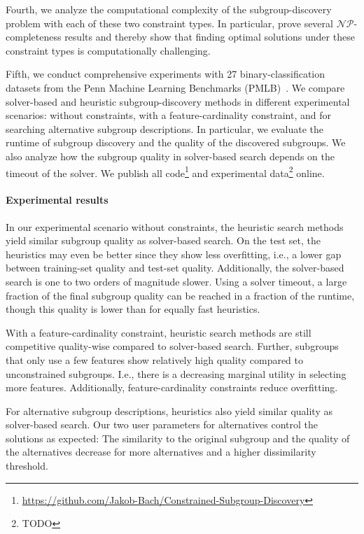 \documentclass{article}
\theoremstyle{definition}
\begin{document}
Fourth, we analyze the computational complexity of the subgroup-discovery problem with each of these two constraint types.
In particular, prove several $\mathcal{NP}$-completeness results and thereby show that finding optimal solutions under these constraint types is computationally challenging.

Fifth, we conduct comprehensive experiments with 27 binary-classification datasets from the Penn Machine Learning Benchmarks (PMLB)~\cite{olson2017pmlb, romano2021pmlb}.
We compare solver-based and heuristic subgroup-discovery methods in different experimental scenarios:
without constraints, with a feature-cardinality constraint, and for searching alternative subgroup descriptions.
In particular, we evaluate the runtime of subgroup discovery and the quality of the discovered subgroups.
We also analyze how the subgroup quality in solver-based search depends on the timeout of the solver.
We publish all code\footnote{\url{https://github.com/Jakob-Bach/Constrained-Subgroup-Discovery}} and experimental data\footnote{TODO} online.

\paragraph{Experimental results}

In our experimental scenario without constraints, the heuristic search methods yield similar subgroup quality as solver-based search.
On the test set, the heuristics may even be better since they show less overfitting, i.e., a lower gap between training-set quality and test-set quality.
Additionally, the solver-based search is one to two orders of magnitude slower.
Using a solver timeout, a large fraction of the final subgroup quality can be reached in a fraction of the runtime, though this quality is lower than for equally fast heuristics.

With a feature-cardinality constraint, heuristic search methods are still competitive quality-wise compared to solver-based search.
Further, subgroups that only use a few features show relatively high quality compared to unconstrained subgroups.
I.e., there is a decreasing marginal utility in selecting more features.
Additionally, feature-cardinality constraints reduce overfitting.

For alternative subgroup descriptions, heuristics also yield similar quality as solver-based search.
Our two user parameters for alternatives control the solutions as expected:
The similarity to the original subgroup and the quality of the alternatives decrease for more alternatives and a higher dissimilarity threshold.
\end{document}
